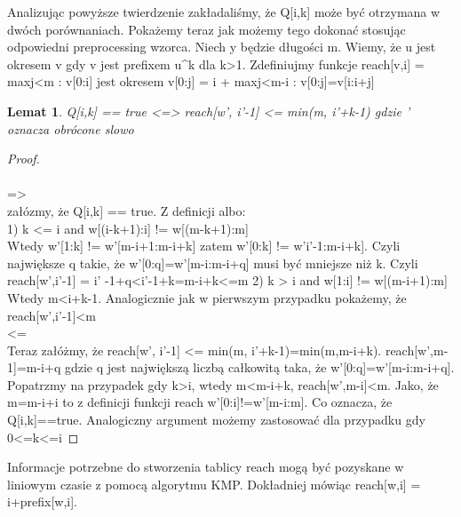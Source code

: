\documentclass[12pt]{article}
\theoremstyle{plain}
\newtheorem*{lemma-thm*}{Lemat}
\begin{document}
Analizując powyższe twierdzenie zakładaliśmy, że Q[i,k] może być otrzymana w dwóch porównaniach. Pokażemy teraz jak możemy tego dokonać stosując odpowiedni preprocessing wzorca.
Niech y będzie długości m. Wiemy, że u jest okresem v gdy v jest prefixem u^k dla k>1.
Zdefiniujmy funkcje reach[v,i] = max{j<m : v[0:i] jest okresem v[0:j]} = i + max{j<m-i : v[0:j]=v[i:i+j]}


\begin{lemma-thm*}
Q[i,k] == true  <=>  reach[w', i'-1] <= min(m, i'+k-1)
gdzie ' oznacza obrócone slowo
\end{lemma-thm*}

\begin{proof}\\
\\
=>\\
załózmy, że Q[i,k] == true. Z definicji albo:\\
1) k <= i and w[(i-k+1):i] != w[(m-k+1):m]\\
Wtedy w'[1:k] != w'[m-i+1:m-i+k] zatem w'[0:k] != w'i'-1:m-i+k]. Czyli największe q takie, że w'[0:q]=w'[m-i:m-i+q] musi być mniejsze niż k. Czyli reach[w',i'-1] = i' -1+q<i'-1+k=m-i+k<=m
2) k > i and w[1:i] != w[(m-i+1):m] \\
Wtedy m<i+k-1. Analogicznie jak w pierwszym przypadku pokażemy, że reach[w',i'-1]<m\\
<=\\
Teraz załóżmy, że reach[w', i'-1] <= min(m, i'+k-1)=min(m,m-i+k).
reach[w',m-1]=m-i+q gdzie q jest największą liczbą całkowitą taka, że w'[0:q]=w'[m-i:m-i+q]. Popatrzmy na przypadek gdy k>i, wtedy m<m-i+k, reach[w',m-i]<m. Jako, że m=m-i+i to z definicji funkcji reach w'[0:i]!=w'[m-i:m]. Co oznacza, że Q[i,k]==true. Analogiczny argument możemy zastosować dla przypadku gdy 0<=k<=i
\end{proof}

Informacje potrzebne do stworzenia tablicy reach mogą być pozyskane w liniowym czasie z pomocą algorytmu KMP. Dokładniej mówiąc reach[w,i] = i+prefix[w,i].
\end{document}
